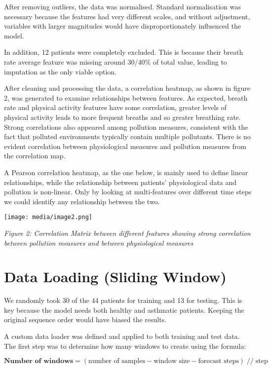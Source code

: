 \documentclass[12pt,a4paper]{report}
\begin{document}
After removing outliers, the data was normalised. Standard normalisation
was necessary because the features had very different scales, and
without adjustment, variables with larger magnitudes would have
disproportionately influenced the model.

In addition, 12 patients were completely excluded. This is because their
breath rate average feature was missing around 30/40\% of total value,
leading to imputation as the only viable option.

After cleaning and processing the data, a correlation heatmap, as shown
in figure 2, was generated to examine relationships between features. As
expected, breath rate and physical activity features have some
correlation, greater levels of physical activity leads to more frequent
breaths and so greater breathing rate. Strong correlations also appeared
among pollution measures, consistent with the fact that polluted
environments typically contain multiple pollutants. There is no evident
correlation between physiological measures and pollution measures from
the correlation map.

A Pearson correlation heatmap, as the one below, is mainly used to
define linear relationships, while the relationship between patients'
physiological data and pollution is non-linear. Only by looking at
multi-features over different time steps we could identify any
relationship between the two.

\begin{center}
    \texttt{[image: media/image2.png]}
    
    \emph{Figure 2: Correlation Matrix between different features showing strong correlation between pollution measures and between physiological measures}
\end{center}

\section{Data Loading (Sliding Window)}
We randomly took 30 of the 44 patients for training and 13 for testing.
This is key because the model needs both healthy and asthmatic patients.
Keeping the original sequence order would have biased the results.

A custom data loader was defined and applied to both training and test
data. The first step was to determine how many windows to create using
the formula:

\vspace{0.em}
\[
\textbf{Number of windows} = (\text{number of samples} - \text{window size} - \text{forecast steps}) \; // \; \text{step}
\]
\end{document}
